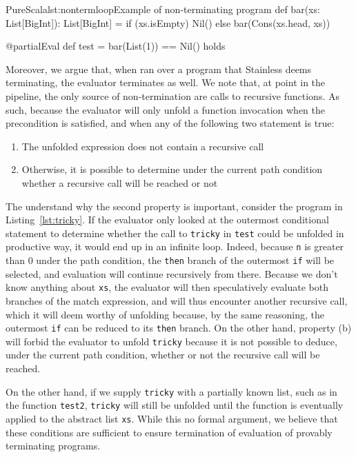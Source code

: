 \documentclass[a4paper,twoside]{article}
\newcommand{\InlineS}[1]{\lstinline[language=PureScala,basicstyle=\small\ttfamily,columns=fixed]|#1|}
\newcommand{\RefCode}[1]{Listing~\ref{#1}}
\newcommand{\stt}[1]{\texttt{\small{#1}}}
\begin{document}
\begin{Code}{PureScala}{lst:nontermloop}{Example of non-terminating program}
def bar(xs: List[BigInt]): List[BigInt] = {
  if (xs.isEmpty) Nil() else bar(Cons(xs.head, xs))
}

@partialEval
def test = {
  bar(List(1)) == Nil()
} holds
\end{Code}

Moreover, we argue that, when ran over a program that Stainless deems terminating, the  evaluator terminates as well. We note that, at point in the pipeline, the only source of non-termination are calls to recursive functions. As such, because the evaluator will only unfold a function invocation when the precondition is satisfied, and when any of the following two statement is true:

\begin{enumerate}[label=(\alph*)]
\item The unfolded expression does not contain a recursive call
\item Otherwise, it is possible to determine under the current path condition whether a recursive call will be reached or not
\end{enumerate}

The understand why the second property is important, consider the program in  \RefCode{lst:tricky}. If the evaluator only looked at the outermost conditional statement to determine whether the call to \stt{tricky} in \stt{test} could be unfolded in productive way, it would end up in an infinite loop. Indeed, because \stt{n} is greater than 0 under the path condition, the \stt{then} branch of the outermost \InlineS{if} will be selected, and evaluation will continue recursively from there. Because we don't know anything about \stt{xs}, the evaluator will then speculatively evaluate both branches of the match expression, and will thus encounter another recursive call, which it will deem worthy of unfolding because, by the same reasoning,  the outermost \InlineS{if} can be reduced to its \stt{then} branch. On the other hand, property (b) will forbid the evaluator to unfold \stt{tricky} because it is not possible to deduce, under the current path condition, whether or not the recursive call will be reached.

On the other hand, if we supply \stt{tricky} with a partially known list, such as in the function \stt{test2}, \stt{tricky} will still be unfolded until the function is eventually applied to the abstract list \stt{xs}. While this no formal argument, we believe that these conditions are sufficient to ensure termination of evaluation of provably terminating programs.\\
\end{document}
